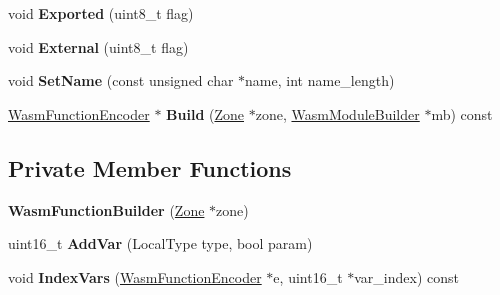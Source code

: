 \begin{DoxyCompactItemize}
\item 
void {\bfseries Exported} (uint8\+\_\+t flag)\hypertarget{classv8_1_1internal_1_1wasm_1_1_wasm_function_builder_a08065b958ed6ed554ae5a2862885e880}{}\label{classv8_1_1internal_1_1wasm_1_1_wasm_function_builder_a08065b958ed6ed554ae5a2862885e880}

\item 
void {\bfseries External} (uint8\+\_\+t flag)\hypertarget{classv8_1_1internal_1_1wasm_1_1_wasm_function_builder_a7f7145eca81885155ed970d3588734ad}{}\label{classv8_1_1internal_1_1wasm_1_1_wasm_function_builder_a7f7145eca81885155ed970d3588734ad}

\item 
void {\bfseries Set\+Name} (const unsigned char $\ast$name, int name\+\_\+length)\hypertarget{classv8_1_1internal_1_1wasm_1_1_wasm_function_builder_abddc1f869cedd292d4f6b27559fe42c5}{}\label{classv8_1_1internal_1_1wasm_1_1_wasm_function_builder_abddc1f869cedd292d4f6b27559fe42c5}

\item 
\hyperlink{classv8_1_1internal_1_1wasm_1_1_wasm_function_encoder}{Wasm\+Function\+Encoder} $\ast$ {\bfseries Build} (\hyperlink{classv8_1_1internal_1_1_zone}{Zone} $\ast$zone, \hyperlink{classv8_1_1internal_1_1wasm_1_1_wasm_module_builder}{Wasm\+Module\+Builder} $\ast$mb) const \hypertarget{classv8_1_1internal_1_1wasm_1_1_wasm_function_builder_ab02f57ef521f71f16df88d94f73d9383}{}\label{classv8_1_1internal_1_1wasm_1_1_wasm_function_builder_ab02f57ef521f71f16df88d94f73d9383}

\end{DoxyCompactItemize}
\subsection*{Private Member Functions}
\begin{DoxyCompactItemize}
\item 
{\bfseries Wasm\+Function\+Builder} (\hyperlink{classv8_1_1internal_1_1_zone}{Zone} $\ast$zone)\hypertarget{classv8_1_1internal_1_1wasm_1_1_wasm_function_builder_a0786146d4dd0151b7cbe6d401398898d}{}\label{classv8_1_1internal_1_1wasm_1_1_wasm_function_builder_a0786146d4dd0151b7cbe6d401398898d}

\item 
uint16\+\_\+t {\bfseries Add\+Var} (Local\+Type type, bool param)\hypertarget{classv8_1_1internal_1_1wasm_1_1_wasm_function_builder_afa0685511c034d3a27850099b2913fde}{}\label{classv8_1_1internal_1_1wasm_1_1_wasm_function_builder_afa0685511c034d3a27850099b2913fde}

\item 
void {\bfseries Index\+Vars} (\hyperlink{classv8_1_1internal_1_1wasm_1_1_wasm_function_encoder}{Wasm\+Function\+Encoder} $\ast$e, uint16\+\_\+t $\ast$var\+\_\+index) const \hypertarget{classv8_1_1internal_1_1wasm_1_1_wasm_function_builder_aa40cdd5d72aedbdf370dfad283efdade}{}\label{classv8_1_1internal_1_1wasm_1_1_wasm_function_builder_aa40cdd5d72aedbdf370dfad283efdade}

\end{DoxyCompactItemize}
